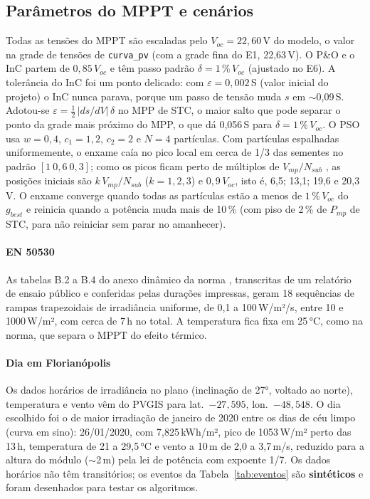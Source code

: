 \documentclass[3p,authoryear]{elsarticle}
\begin{document}
\subsection{Parâmetros do MPPT e cenários}
\label{sec:cenarios}

Todas as tensões do MPPT são escaladas pelo $V_{oc} = 22{,}60$\,V do modelo, o valor na grade de
tensões de \texttt{curva\_pv} (com a grade fina do E1, 22,63\,V). O P\&O e o InC
partem de $0{,}85\,V_{oc}$ e têm passo padrão $\delta = 1\,\%\,V_{oc}$ (ajustado no E6). A
tolerância do InC foi um ponto delicado: com $\varepsilon = 0{,}002$\,S (valor inicial do
projeto) o InC nunca parava, porque um passo de tensão muda $s$ em $\sim$0,09\,S. Adotou-se
$\varepsilon = \tfrac12\,|ds/dV|\,\delta$ no MPP de STC, o maior salto que pode separar o
ponto da grade mais próximo do MPP, o que dá 0,056\,S para $\delta = 1\,\%\,V_{oc}$. O PSO usa
$w = 0{,}4$, $c_1 = 1{,}2$, $c_2 = 2$ e $N = 4$ partículas. Com partículas espalhadas
uniformemente, o enxame caía no pico local em cerca de 1/3 das sementes no padrão
$[1\ 0{,}6\ 0{,}3]$; como os picos ficam perto de múltiplos de $V_{mp}/N_{sub}$ \citep{patel},
as posições iniciais são $k\,V_{mp}/N_{sub}$ ($k = 1, 2, 3$) e $0{,}9\,V_{oc}$, isto é, 6,5;
13,1; 19,6 e 20,3\,V. O enxame converge quando todas as partículas estão a menos de
$1\,\%\,V_{oc}$ do $g_{best}$ e reinicia quando a potência muda mais de 10\,\% (com piso de
2\,\% de $P_{mp}$ de STC, para não reiniciar sem parar no amanhecer).

\paragraph{EN 50530} As tabelas B.2 a B.4 do anexo dinâmico da norma \citep{en50530},
transcritas de um relatório de ensaio público \citep{tuv} e conferidas pelas durações
impressas, geram 18 sequências de rampas trapezoidais de irradiância uniforme, de
0,1 a 100\,W/m²/s, entre 10 e 1000\,W/m², com cerca de 7\,h no total. A temperatura fica fixa em
25\,°C, como na norma, que separa o MPPT do efeito térmico.

\paragraph{Dia em Florianópolis} Os dados horários de irradiância no plano (inclinação de
27°, voltado ao norte), temperatura e vento vêm do PVGIS \citep{pvgis} para
lat.\ $-27{,}595$, lon.\ $-48{,}548$. O dia escolhido foi o de maior irradiação de janeiro de
2020 entre os dias de céu limpo (curva em sino): 26/01/2020, com 7,825\,kWh/m², pico de
1053\,W/m² perto das 13\,h, temperatura de 21 a 29,5\,°C e vento a 10\,m de 2,0 a 3,7\,m/s,
reduzido para a altura do módulo ($\sim$2\,m) pela lei de potência com expoente 1/7. Os
dados horários não têm transitórios; os eventos da Tabela~\ref{tab:eventos} são
\textbf{sintéticos} e foram desenhados para testar os algoritmos.
\end{document}

